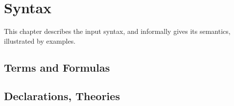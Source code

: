 \chapter{Syntax}

This chapter describes the input syntax, and informally gives its semantics,
illustrated by examples.

\section{Terms and Formulas}

\section{Declarations, Theories}


